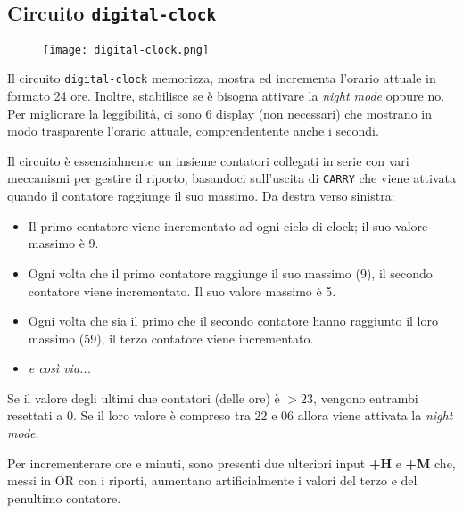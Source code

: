 \documentclass{article}
\def\code#1{\texttt{#1}}
\begin{document}
\clearpage

\subsection{Circuito \code{digital-clock}}
\begin{figure}[htp]
    \texttt{[image: digital-clock.png]}
\end{figure}
Il circuito \code{digital-clock} memorizza, mostra ed incrementa l'orario attuale in formato 24 ore. Inoltre, stabilisce se è bisogna attivare la \textit{night mode} oppure no.
Per migliorare la leggibilità, ci sono 6 display (non necessari) che mostrano in modo trasparente l'orario attuale, comprendentente anche i secondi. 

Il circuito è essenzialmente un insieme contatori collegati in serie con vari meccanismi per gestire il riporto, basandoci sull'uscita di \code{CARRY} che viene attivata quando il contatore raggiunge il suo massimo.
Da destra verso sinistra:
\begin{itemize}
    \item Il primo contatore viene incrementato ad ogni ciclo di clock; il suo valore massimo è 9.
    \item Ogni volta che il primo contatore raggiunge il suo massimo (9), il secondo contatore viene incrementato. Il suo valore massimo è 5.
    \item Ogni volta che sia il primo che il secondo contatore hanno raggiunto il loro massimo (59), il terzo contatore viene incrementato.
    \item \textit{e così via...}
\end{itemize}
Se il valore degli ultimi due contatori (delle ore) è $>23$, vengono entrambi resettati a 0. Se il loro valore è compreso tra 22 e 06 allora viene attivata la \textit{night mode}.

Per incrementerare ore e minuti, sono presenti due ulteriori input \textbf{+H} e \textbf{+M} che, messi in OR con i riporti, aumentano artificialmente i valori del terzo e del penultimo contatore.
\end{document}
